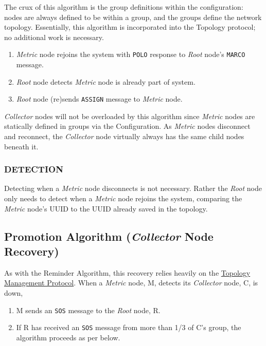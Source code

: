 The crux of this algorithm is the group definitions within the \dcamp configuration: nodes are always defined to be
within a group, and the groups define the network topology. Essentially, this algorithm is incorporated into the
Topology protocol; no additional work is necessary.

\begin{enumerate}
\item \textit{Metric} node rejoins the system with \texttt{POLO} response to \textit{Root} node's \texttt{MARCO}
      message.
\item \textit{Root} node detects \textit{Metric} node is already part of \dcamp system.
\item \textit{Root} node (re)sends \texttt{ASSIGN} message to \textit{Metric} node.
\end{enumerate}

\textit{Collector} nodes will not be overloaded by this algorithm since \textit{Metric} nodes are statically defined in
groups via the \dcamp Configuration. As \textit{Metric} nodes disconnect and reconnect, the \textit{Collector} node
virtually always has the same child nodes beneath it.

\subsubsection{DETECTION}

Detecting when a \textit{Metric} node disconnects is not necessary. Rather the \textit{Root} node only needs to detect
when a \textit{Metric} node rejoins the \dcamp system, comparing the \textit{Metric} node's UUID to the UUID already
saved in the topology.

\subsection{Promotion Algorithm (\textit{Collector} Node Recovery)}
\label{algor_promo}

As with the Reminder Algorithm, this recovery relies heavily on the \hyperref[proto_topo]{Topology Management Protocol}.
When a \textit{Metric} node, M, detects its \textit{Collector} node, C, is down, 

\begin{enumerate}
\item M sends an \texttt{SOS} message to the \textit{Root} node, R.
\item If R has received an \texttt{SOS} message from more than 1/3 of C's group, the algorithm proceeds as per below.
\end{enumerate}

